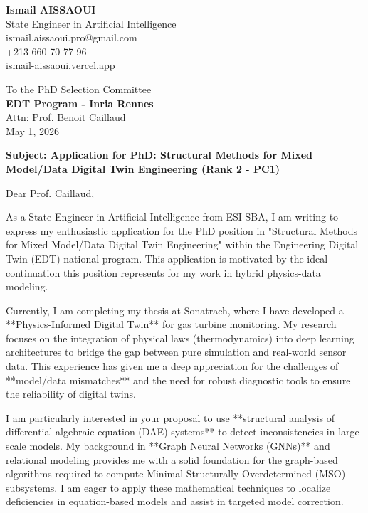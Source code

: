 \documentclass[a4paper,12pt]{article}
\begin{document}
\begin{flushleft}
    \textbf{Ismail AISSAOUI} \\
    State Engineer in Artificial Intelligence \\
    ismail.aissaoui.pro@gmail.com \\
    +213 660 70 77 96 \\
    \href{https://ismail-aissaoui.vercel.app}{ismail-aissaoui.vercel.app}
\end{flushleft}

\begin{flushright}
    To the PhD Selection Committee \\
    \textbf{EDT Program - Inria Rennes} \\
    Attn: Prof. Benoit Caillaud \\
    \medskip
    May 1, 2026
\end{flushright}

\bigskip

\noindent \textbf{Subject: Application for PhD: Structural Methods for Mixed Model/Data Digital Twin Engineering (Rank 2 - PC1)}

\bigskip

Dear Prof. Caillaud,

As a State Engineer in Artificial Intelligence from ESI-SBA, I am writing to express my enthusiastic application for the PhD position in "Structural Methods for Mixed Model/Data Digital Twin Engineering" within the Engineering Digital Twin (EDT) national program. This application is motivated by the ideal continuation this position represents for my work in hybrid physics-data modeling.

Currently, I am completing my thesis at Sonatrach, where I have developed a **Physics-Informed Digital Twin** for gas turbine monitoring. My research focuses on the integration of physical laws (thermodynamics) into deep learning architectures to bridge the gap between pure simulation and real-world sensor data. This experience has given me a deep appreciation for the challenges of **model/data mismatches** and the need for robust diagnostic tools to ensure the reliability of digital twins.

I am particularly interested in your proposal to use **structural analysis of differential-algebraic equation (DAE) systems** to detect inconsistencies in large-scale models. My background in **Graph Neural Networks (GNNs)** and relational modeling provides me with a solid foundation for the graph-based algorithms required to compute Minimal Structurally Overdetermined (MSO) subsystems. I am eager to apply these mathematical techniques to localize deficiencies in equation-based models and assist in targeted model correction.
\end{document}
